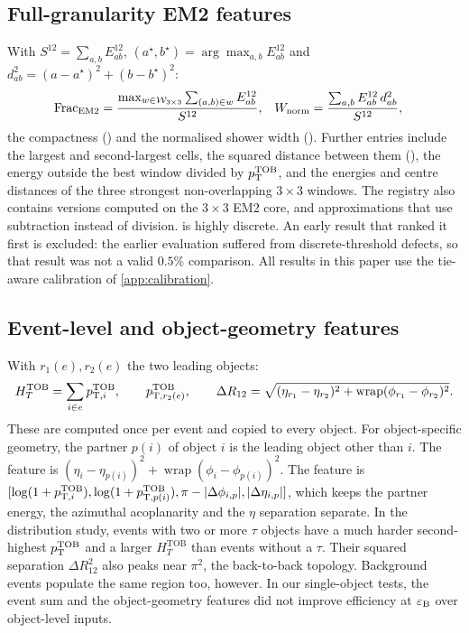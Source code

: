 \subsection{Full-granularity EM2 features}
\label{app:em2_features}
With $S^{12}=\sum_{a,b}E^{12}_{ab}$, $(a^\star,b^\star)=\arg\max_{a,b}E^{12}_{ab}$ and $d^2_{ab}=(a-a^\star)^2+(b-b^\star)^2$:
\begin{align}
  \mathrm{Frac}_{\mathrm{EM2}} &= \frac{\max_{w\in\mathcal{W}_{3\times3}}\sum_{(a,b)\in w}E^{12}_{ab}}{S^{12}},
  &
  W_{\mathrm{norm}} &= \frac{\sum_{a,b}E^{12}_{ab}\,d^2_{ab}}{S^{12}},
\end{align}
the compactness () and the normalised shower width (). Further entries include the largest and second-largest cells, the squared distance between them (), the energy outside the best window divided by $p_{\mathrm{T}}^{\mathrm{TOB}}$, and the energies and centre distances of the three strongest non-overlapping $3\times3$ windows. The registry also contains versions computed on the $3\times3$ EM2 core, and approximations that use subtraction instead of division.  is highly discrete. An early result that ranked it first is excluded: the earlier evaluation suffered from discrete-threshold defects, so that result was not a valid $0.5\%$ comparison. All results in this paper use the tie-aware calibration of \cref{app:calibration}.

\subsection{Event-level and object-geometry features}
With $r_1(e),r_2(e)$ the two leading objects:
\begin{equation}
  H_T^{\mathrm{TOB}}=\sum_{i\in e}p_{\mathrm{T},i}^{\mathrm{TOB}},\qquad
  p_{\mathrm{T},r_2(e)}^{\mathrm{TOB}},\qquad
  \Delta R_{12}=\sqrt{(\eta_{r_1}-\eta_{r_2})^2+\operatorname{wrap}(\phi_{r_1}-\phi_{r_2})^2} .
\end{equation}
These are computed once per event and copied to every object. For object-specific geometry, the partner $p(i)$ of object $i$ is the leading object other than $i$. The feature  is $(\eta_i-\eta_{p(i)})^2+\operatorname{wrap}(\phi_i-\phi_{p(i)})^2$. The feature  is $[\log(1+p_{\mathrm{T},i}^{\mathrm{TOB}}),\log(1+p_{\mathrm{T},p(i)}^{\mathrm{TOB}}),\pi-|\Delta\phi_{i,p}|,|\Delta\eta_{i,p}|]$, which keeps the partner energy, the azimuthal acoplanarity and the $\eta$ separation separate. In the distribution study, events with two or more $\tau$ objects have a much harder second-highest $p_{\mathrm{T}}^{\mathrm{TOB}}$ and a larger $H_T^{\mathrm{TOB}}$ than events without a $\tau$. Their squared separation $\Delta R^2_{12}$ also peaks near $\pi^2$, the back-to-back topology. Background events populate the same region too, however. In our single-object tests, the event sum and the object-geometry features did not improve efficiency at $\varepsilon_{\mathrm{B}}$ over object-level inputs.
